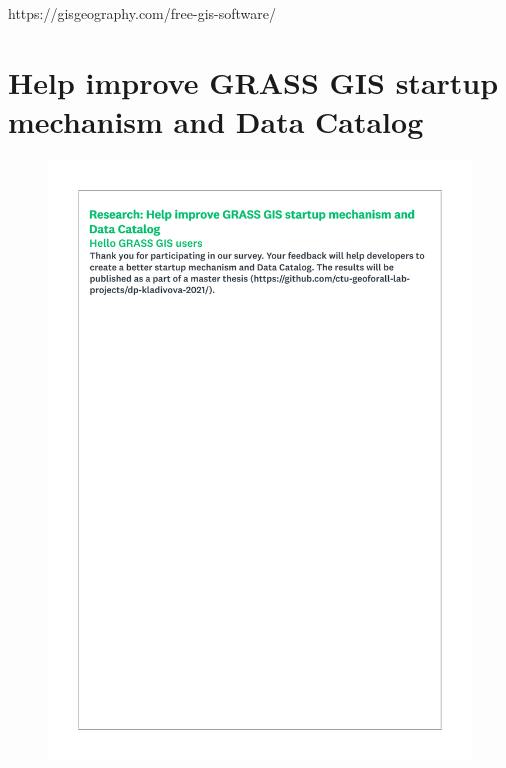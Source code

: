 \documentclass[a4paper,10pt,twoside]{article}
\begin{document}
https://gisgeography.com/free-gis-software/\\

\newpage
\vspace*{-1cm}
\appendix
\section{Help improve GRASS GIS startup mechanism and Data Catalog }
\label{appendix:A}
\setcounter{page}{1} 
 
 \begin{figure}[hbt!]
 \begin{center}
 \includegraphics[width=12.5cm]{../surveys/questionnaires/survey1_part1_page1_intro.pdf}
 \end{center}
 \end{figure}
 
\end{document}
